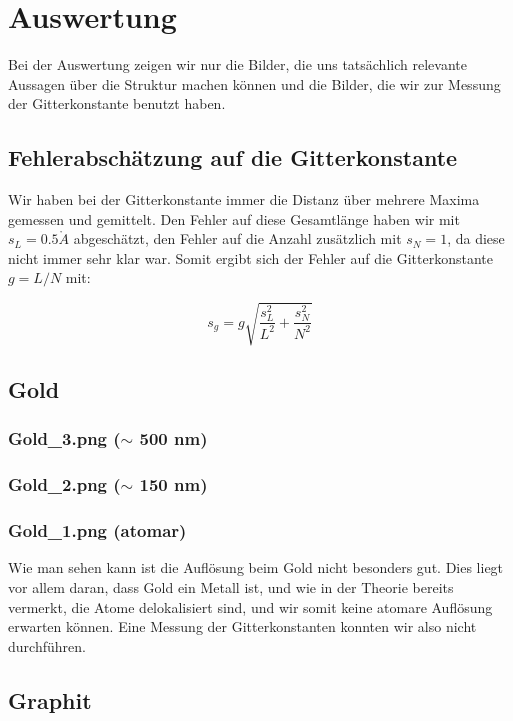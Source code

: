 \section{Auswertung}

Bei der Auswertung zeigen wir nur die Bilder, die uns tatsächlich relevante Aussagen über die Struktur machen können und die Bilder, die wir zur Messung der Gitterkonstante benutzt haben.

\subsection{Fehlerabschätzung auf die Gitterkonstante}

Wir haben bei der Gitterkonstante immer die Distanz über mehrere Maxima gemessen und gemittelt. Den Fehler auf diese Gesamtlänge haben wir mit $s_L = 0.5 \mathring A$ abgeschätzt, den Fehler auf die Anzahl zusätzlich mit $s_N = 1$, da diese nicht immer sehr klar war. Somit ergibt sich der Fehler auf die Gitterkonstante $g=L/N$ mit:

$$s_g = g\sqrt{\frac{s_L^2}{L^2} + \frac{s_N^2}{N^2}} $$

\subsection{Gold}

\subsubsection{Gold\_3.png ($\sim$ 500 nm)}
\subsubsection{Gold\_2.png ($\sim$ 150 nm)}
\subsubsection{Gold\_1.png (atomar)}

Wie man sehen kann ist die Auflösung beim Gold nicht besonders gut. Dies liegt vor allem daran, dass Gold ein Metall ist, und wie in der Theorie bereits vermerkt, die Atome delokalisiert sind, und wir somit keine atomare Auflösung erwarten können. Eine Messung der Gitterkonstanten konnten wir also nicht durchführen.

\subsection{Graphit}

